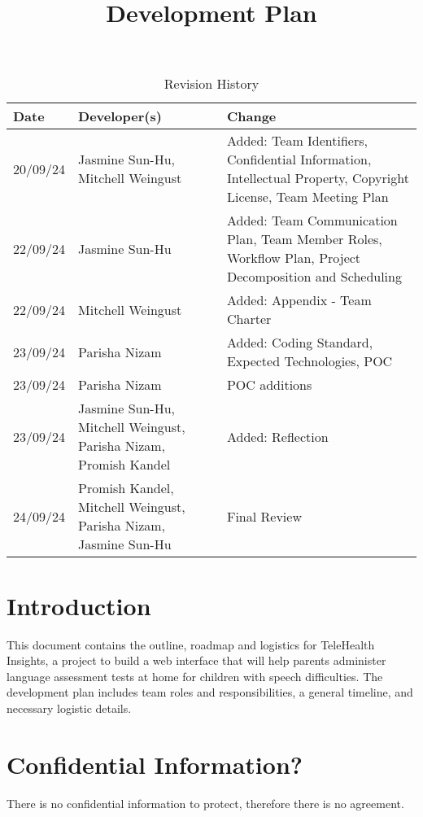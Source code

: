 \documentclass{article}
\title{Development Plan\\\progname}
\author{\authname}
\date{}
\begin{document}
\maketitle

\begin{table}[hp]
\caption{Revision History} \label{TblRevisionHistory}
\begin{tabularx}{\textwidth}{p{1.5cm}p{3cm}X}
\toprule
\textbf{Date} & \textbf{Developer(s)} & \textbf{Change}\\
\midrule
20/09/24 & Jasmine Sun-Hu, Mitchell Weingust & Added: Team Identifiers, Confidential Information, Intellectual Property,
Copyright License, Team Meeting Plan\\
22/09/24 & Jasmine Sun-Hu & Added: Team Communication Plan, Team Member Roles, Workflow Plan, Project Decomposition and Scheduling\\
22/09/24 & Mitchell Weingust & Added: Appendix - Team Charter\\
23/09/24 & Parisha Nizam & Added: Coding Standard, Expected Technologies, POC \\
23/09/24 & Parisha Nizam & POC additions \\
23/09/24 & Jasmine Sun-Hu, Mitchell Weingust, Parisha Nizam, Promish Kandel & Added: Reflection \\
24/09/24 & Promish Kandel, Mitchell Weingust, Parisha Nizam, Jasmine Sun-Hu & Final Review\\
\bottomrule
\end{tabularx}
\end{table}

\newpage{}

\section*{Introduction}

This document contains the outline, roadmap and logistics for TeleHealth Insights, a project to build a web 
interface that will help parents administer language assessment tests at home for children with speech
difficulties. The development plan includes team roles and responsibilities, a general timeline, and 
necessary logistic details.

\section{Confidential Information?}

There is no confidential information to protect, therefore there is no agreement.
\end{document}
